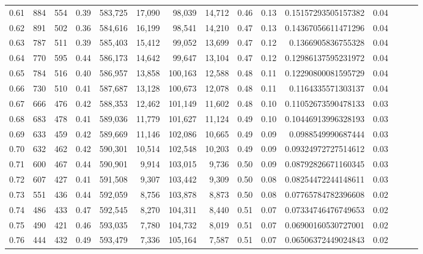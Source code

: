 \begin{tabular}{rrrrrrrrrrrrrrr}
0.61 &     884 &    554 &  0.39 &  583,725 &   17,090 &   98,039 &   14,712 &  0.46 &  0.13 &   0.15157293505157382 &      0.04 \\
0.62 &     891 &    502 &  0.36 &  584,616 &   16,199 &   98,541 &   14,210 &  0.47 &  0.13 &   0.14367056611471296 &      0.04 \\
0.63 &     787 &    511 &  0.39 &  585,403 &   15,412 &   99,052 &   13,699 &  0.47 &  0.12 &    0.1366905836755328 &      0.04 \\
0.64 &     770 &    595 &  0.44 &  586,173 &   14,642 &   99,647 &   13,104 &  0.47 &  0.12 &   0.12986137595231972 &      0.04 \\
0.65 &     784 &    516 &  0.40 &  586,957 &   13,858 &  100,163 &   12,588 &  0.48 &  0.11 &   0.12290800081595729 &      0.04 \\
0.66 &     730 &    510 &  0.41 &  587,687 &   13,128 &  100,673 &   12,078 &  0.48 &  0.11 &    0.1164335571303137 &      0.04 \\
0.67 &     666 &    476 &  0.42 &  588,353 &   12,462 &  101,149 &   11,602 &  0.48 &  0.10 &   0.11052673590478133 &      0.03 \\
0.68 &     683 &    478 &  0.41 &  589,036 &   11,779 &  101,627 &   11,124 &  0.49 &  0.10 &   0.10446913996328193 &      0.03 \\
0.69 &     633 &    459 &  0.42 &  589,669 &   11,146 &  102,086 &   10,665 &  0.49 &  0.09 &    0.0988549990687444 &      0.03 \\
0.70 &     632 &    462 &  0.42 &  590,301 &   10,514 &  102,548 &   10,203 &  0.49 &  0.09 &   0.09324972727514612 &      0.03 \\
0.71 &     600 &    467 &  0.44 &  590,901 &    9,914 &  103,015 &    9,736 &  0.50 &  0.09 &   0.08792826671160345 &      0.03 \\
0.72 &     607 &    427 &  0.41 &  591,508 &    9,307 &  103,442 &    9,309 &  0.50 &  0.08 &   0.08254472244148611 &      0.03 \\
0.73 &     551 &    436 &  0.44 &  592,059 &    8,756 &  103,878 &    8,873 &  0.50 &  0.08 &   0.07765784782396608 &      0.02 \\
0.74 &     486 &    433 &  0.47 &  592,545 &    8,270 &  104,311 &    8,440 &  0.51 &  0.07 &   0.07334746476749653 &      0.02 \\
0.75 &     490 &    421 &  0.46 &  593,035 &    7,780 &  104,732 &    8,019 &  0.51 &  0.07 &   0.06900160530727001 &      0.02 \\
0.76 &     444 &    432 &  0.49 &  593,479 &    7,336 &  105,164 &    7,587 &  0.51 &  0.07 &   0.06506372449024843 &      0.02 \\

\end{tabular}
